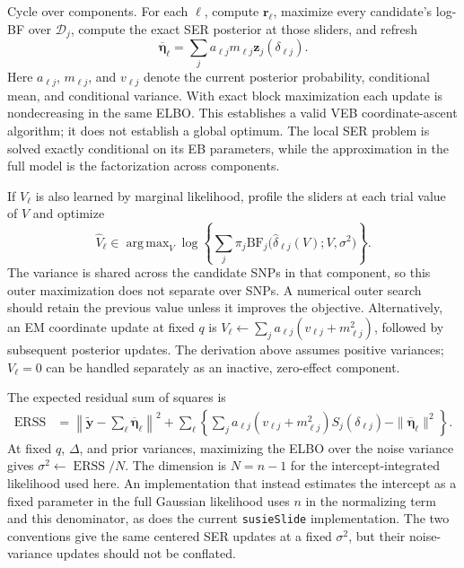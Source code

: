\documentclass[11pt]{article}
\newcommand{\BF}{\mathrm{BF}}
\DeclareMathOperator*{\argmax}{arg\,max}
\begin{document}
Cycle over components. For each $\ell$, compute
$\mathbf r_\ell$, maximize every candidate's log-BF over
$\mathcal D_j$, compute the exact SER posterior at those sliders,
and refresh
\begin{equation}
\overline{\boldsymbol\eta}_\ell
 =\sum_j a_{\ell j}m_{\ell j}
              \mathbf z_j(\delta_{\ell j}).
\label{eq:veb-component-mean}
\end{equation}
Here $a_{\ell j}$, $m_{\ell j}$, and $v_{\ell j}$ denote the
current posterior probability, conditional mean, and conditional
variance. With exact block maximization each update is
nondecreasing in the same ELBO. This establishes a valid VEB
coordinate-ascent algorithm; it does not establish a global optimum.
The local SER problem is solved exactly conditional on its EB
parameters, while the approximation in the full model is the
factorization across components.

If $V_\ell$ is also learned by marginal likelihood, profile the
sliders at each trial value of $V$ and optimize
\begin{equation}
\widehat V_\ell\in\argmax_V
 \log\left\{\sum_j\pi_j
  \BF_j\bigl(\widehat\delta_{\ell j}(V);V,\sigma^2\bigr)\right\}.
\label{eq:veb-profile-prior-variance}
\end{equation}
The variance is shared across the candidate SNPs in that component,
so this outer maximization does not separate over SNPs. A numerical
outer search should retain the previous value unless it improves
the objective. Alternatively, an EM coordinate update at fixed
$q$ is $V_\ell\leftarrow\sum_j a_{\ell j}(v_{\ell j}+m_{\ell j}^2)$,
followed by subsequent posterior updates. The derivation above
assumes positive variances; $V_\ell=0$ can be handled separately
as an inactive, zero-effect component.

The expected residual sum of squares is
\begin{align}
\operatorname{ERSS}
 &=\left\|\widetilde{\mathbf y}
        -\sum_\ell\overline{\boldsymbol\eta}_\ell\right\|^2
   +\sum_\ell\left\{
      \sum_j a_{\ell j}(v_{\ell j}+m_{\ell j}^2)
                    S_j(\delta_{\ell j})
      -\|\overline{\boldsymbol\eta}_\ell\|^2\right\}.
\label{eq:veb-erss}
\end{align}
At fixed $q$, $\Delta$, and prior variances, maximizing the ELBO
over the noise variance gives $\sigma^2\leftarrow\operatorname{ERSS}/N$.
The dimension is $N=n-1$ for the intercept-integrated likelihood used
here. An implementation that instead estimates the intercept as a
fixed parameter in the full Gaussian likelihood uses $n$ in the
normalizing term and this denominator, as does the current
\texttt{susieSlide} implementation. The two conventions give the
same centered SER updates at a fixed $\sigma^2$, but their
noise-variance updates should not be conflated.
\end{document}
